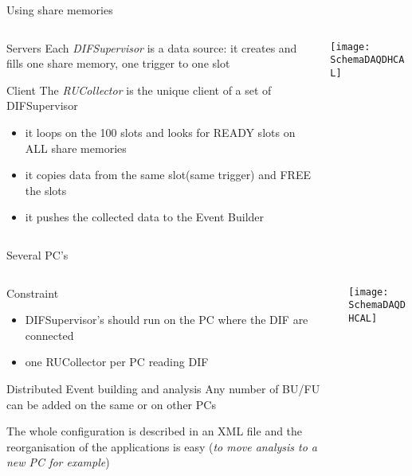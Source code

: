 \documentclass[10pt]{beamer}
\begin{document}
\begin{frame}{Using share memories}
\begin{columns}
 \begin{column}{0.5\textwidth}
\begin{block}{Servers}
Each {\sl DIFSupervisor} is a data source: it creates and fills one share memory, one trigger to one slot
\end{block}
\pause 
\begin{block}{Client}
 The {\sl RUCollector} is the unique client of a set of DIFSupervisor
 \begin{itemize}
   \item it loops on the 100 slots and looks for READY slots on ALL share memories
   \item it copies data from the same slot(same trigger) and FREE the slots
   \item it pushes the collected data to the Event Builder 
 \end{itemize}
\end{block}
\end{column}
 \begin{column}{0.5\textwidth}
   \centerline{\texttt{[image: SchemaDAQDHCAL]}}
\end{column}
\end{columns}


\end{frame}

\begin{frame}{Several PC's}

\begin{columns}
 \begin{column}{0.5\textwidth}

\begin{block}{Constraint}
  \begin{itemize}
    \item DIFSupervisor's should run on the PC where the DIF are connected 
    \item one RUCollector per PC reading DIF
  \end{itemize}
\end{block}
\pause
\begin{block}{Distributed Event building and analysis}
Any number of BU/FU can be added on the same or on other PCs

The whole configuration is described in an XML file and the reorganisation of the applications is easy ({\sl to move analysis to a new PC for example})
\end{block}
\end{column}
 \begin{column}{0.5\textwidth}
   \centerline{\texttt{[image: SchemaDAQDHCAL]}}
\end{column}
\end{columns}


\end{frame}
\end{document}
